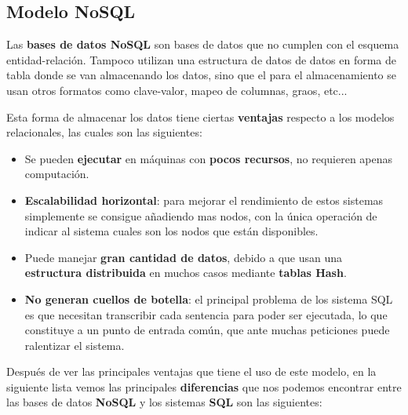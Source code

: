 \subsection{Modelo NoSQL}
Las \textbf{bases de datos NoSQL} son bases de datos que no cumplen con el esquema entidad-relación. Tampoco utilizan una estructura de datos de datos en forma de tabla donde se van almacenando los datos, sino que el para el almacenamiento se usan otros formatos como clave-valor, mapeo de columnas, graos, etc...

Esta forma de almacenar los datos tiene ciertas \textbf{ventajas} respecto a los modelos relacionales, las cuales son las siguientes:

\begin{itemize}
    \item Se pueden \textbf{ejecutar} en máquinas con \textbf{pocos recursos}, no requieren apenas computación.
    \item \textbf{Escalabilidad horizontal}: para mejorar el rendimiento de estos sistemas simplemente se consigue añadiendo mas nodos, con la única operación de indicar al sistema cuales son los nodos que están disponibles.
    \item Puede manejar \textbf{gran cantidad de datos}, debido a que usan una \textbf{estructura distribuida} en muchos casos mediante \textbf{tablas Hash}.
    \item \textbf{No generan cuellos de botella}: el principal problema de los sistema SQL es que necesitan transcribir cada sentencia para poder ser ejecutada, lo que constituye a un punto de entrada común, que ante muchas peticiones puede ralentizar el sistema.
\end{itemize}

Después de ver las principales ventajas que tiene el uso de este modelo, en la siguiente lista vemos las principales \textbf{diferencias} que nos podemos encontrar entre las bases de datos \textbf{NoSQL} y los sistemas \textbf{SQL} son las siguientes:

